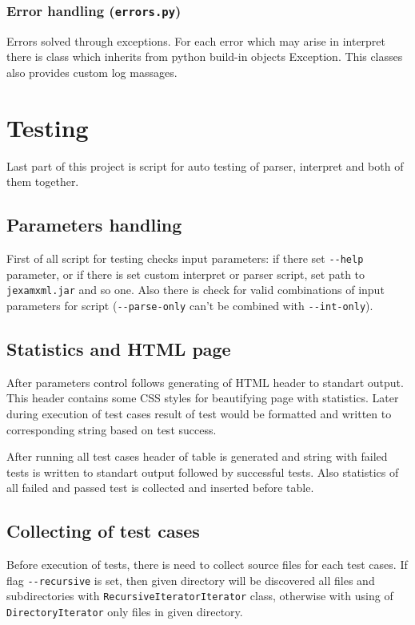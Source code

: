 \documentclass[10pt,a4paper]{article}
\begin{document}
\subsubsection{Error handling (\texttt{errors.py})}

Errors solved through exceptions. For each error which may arise in interpret 
there is class which inherits from python build-in objects Exception. This 
classes also provides custom log massages.  

\section{Testing}

Last part of this project is script for auto testing of parser, interpret and 
both of them together. 

\subsection{Parameters handling}

First of all script for testing checks input parameters: if there set 
\texttt{-{}-help} parameter, or if there is set custom interpret or parser 
script, set path to \texttt{jexamxml.jar} and so one. Also there is check for 
valid combinations of input parameters for script (\texttt{-{}-parse-only} can't 
be combined with \texttt{-{}-int-only}).

\subsection{Statistics and HTML page}

After parameters control follows generating of HTML header to standart output. 
This header contains some CSS styles for beautifying page with statistics.  
Later during execution of test cases result of test would be formatted and 
written to corresponding string based on test success.

After running all test cases header of table is generated and string with failed 
tests is written to standart output followed by successful tests. Also statistics 
of all failed and passed test is collected and inserted before table.

\subsection{Collecting of test cases}

Before execution of tests, there is need to collect source files for each test 
cases. If flag \texttt{-{}-recursive} is set, then given directory will be 
discovered all files and subdirectories with \texttt{RecursiveIteratorIterator} 
class, otherwise with using of \texttt{DirectoryIterator} only files in given 
directory.
\end{document}
